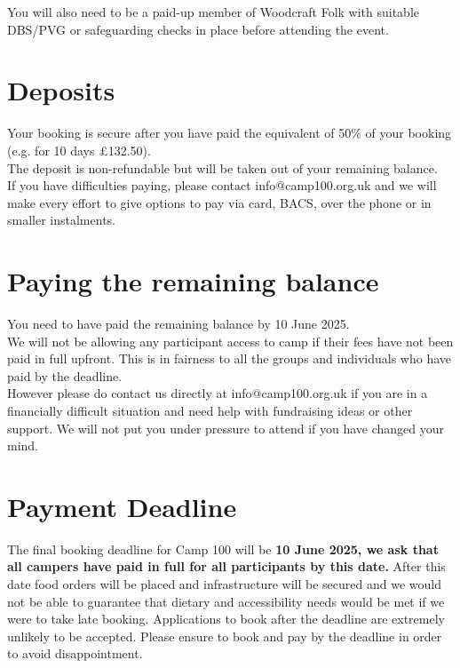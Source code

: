 \documentclass[a4paper, 11pt]{report}
\begin{document}
You will also need to be a paid-up member of Woodcraft Folk with suitable DBS/PVG or safeguarding checks in place before attending the event. 

\section{Deposits}
Your booking is secure after you have paid the equivalent of 50\% of your booking (e.g. for 10 days £132.50). \\

The deposit is non-refundable but will be taken out of your remaining balance.\\

If you have difficulties paying, please contact info@camp100.org.uk and we will make every effort to give options to pay via card, BACS, over the phone or in smaller instalments. 

\section{Paying the remaining balance}
You need to have paid the remaining balance by 10 June 2025.\\

We will not be allowing any participant access to camp if their fees have not been paid in full upfront. This is in fairness to all the groups and individuals who have paid by the deadline.\\

However please do contact us directly at info@camp100.org.uk if you are in a financially difficult situation and need help with fundraising ideas or other support. We will not put you under pressure to attend if you have changed your mind.

\section{Payment Deadline}
The final booking deadline for Camp 100 will be \textbf{10 June 2025, we ask that all campers have paid in full for all participants by this date.} After this date food orders will be placed and infrastructure will be secured and we would not be able to guarantee that dietary and accessibility needs would be met if we were to take late booking. Applications to book after the deadline are extremely unlikely to be accepted. Please ensure to book and pay by the deadline in order to avoid disappointment. \\
\end{document}
